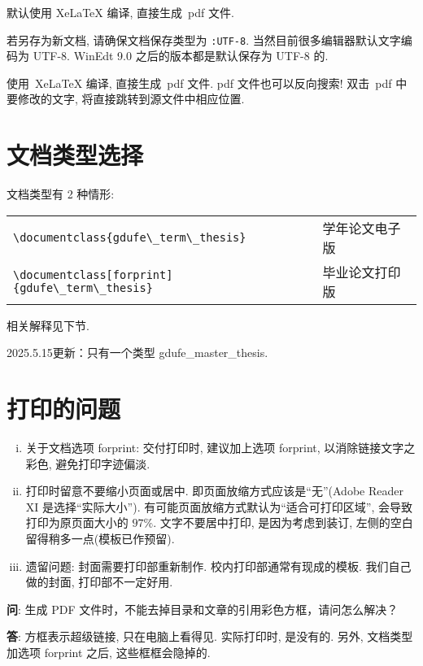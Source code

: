 \documentclass[forprint]{gdufe_master_thesis}
\begin{document}
默认使用 XeLaTeX 编译, 直接生成~pdf 文件.

若另存为新文档, 请确保文档保存类型为 \verb|:UTF-8|. 当然目前很多编辑器默认文字编码为 UTF-8.
WinEdt 9.0 之后的版本都是默认保存为 UTF-8 的.

使用~XeLaTeX 编译, 直接生成~pdf 文件.
pdf 文件也可以反向搜索! 双击~pdf 中要修改的文字, 将直接跳转到源文件中相应位置.

\section{文档类型选择}
文档类型有 2 种情形:

\begin{table}[ht]\centering
    \begin{tabular}{ll}
        \hline
        \verb|\documentclass{gdufe\_term\_thesis}|           & 学年论文电子版 \\
        \verb|\documentclass[forprint]{gdufe\_term\_thesis}| & 毕业论文打印版 \\
        \hline
    \end{tabular}
\end{table}
相关解释见下节.

2025.5.15更新：只有一个类型 gdufe\_master\_thesis.

\section{打印的问题}
\begin{enumerate}[i)]
    \item  关于文档选项 forprint: 交付打印时, 建议加上选项 forprint, 以消除链接文字之彩色, 避免打印字迹偏淡.
    \item  打印时留意不要缩小页面或居中. 即页面放缩方式应该是``无''(Adobe Reader XI 是选择``实际大小'').
          有可能页面放缩方式默认为``适合可打印区域'', 会导致打印为原页面大小的 $97\%$.
          文字不要居中打印, 是因为考虑到装订, 左侧的空白留得稍多一点(模板已作预留).
    \item  遗留问题: 封面需要打印部重新制作.  校内打印部通常有现成的模板.
          我们自己做的封面, 打印部不一定好用.
\end{enumerate}

\textbf{问}: {\kaishu 生成 PDF 文件时，不能去掉目录和文章的引用彩色方框，请问怎么解决？}

\textbf{答}: {\kaishu 方框表示超级链接, 只在电脑上看得见. 实际打印时, 是没有的. 另外, 文档类型加选项 forprint 之后, 这些框框会隐掉的. }
\end{document}
